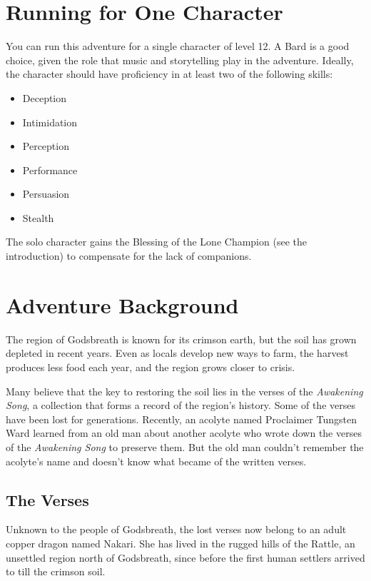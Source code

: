 \documentclass[letterpaper, 11pt, twocolumn]{dndbook}
\begin{document}
\section{Running for One Character}

You can run this adventure for a single character of level 12. A Bard is a good choice, given the role that music and storytelling play in the adventure. Ideally, the character should have proficiency in at least two of the following skills:

\begin{itemize}
\item Deception
\item Intimidation
\item Perception
\item Performance
\item Persuasion
\item Stealth
\end{itemize}

The solo character gains the Blessing of the Lone Champion (see the introduction) to compensate for the lack of companions.
\section{Adventure Background}

The region of Godsbreath is known for its crimson earth, but the soil has grown depleted in recent years. Even as locals develop new ways to farm, the harvest produces less food each year, and the region grows closer to crisis.

Many believe that the key to restoring the soil lies in the verses of the \textit{Awakening Song}, a collection that forms a record of the region's history. Some of the verses have been lost for generations. Recently, an acolyte named Proclaimer Tungsten Ward learned from an old man about another acolyte who wrote down the verses of the \textit{Awakening Song} to preserve them. But the old man couldn't remember the acolyte's name and doesn't know what became of the written verses.

\subsection{The Verses}

Unknown to the people of Godsbreath, the lost verses now belong to an adult copper dragon named Nakari. She has lived in the rugged hills of the Rattle, an unsettled region north of Godsbreath, since before the first human settlers arrived to till the crimson soil.
\end{document}
